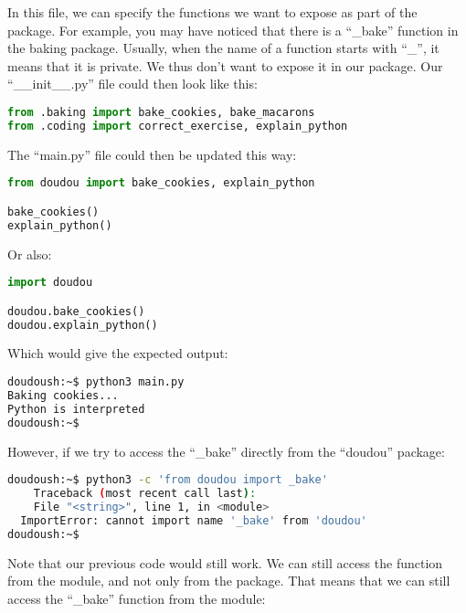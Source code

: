 \vspace{5mm}


\vspace{5mm}

In this file, we can specify the functions we want to expose as part of the package.
For example, you may have noticed that there is a ``\_bake'' function in the baking package.
Usually, when the name of a function starts with ``\_'', it means that it is private.
We thus don't want to expose it in our package. Our ``\_\_init\_\_.py'' file could then
look like this:

\begin{lstlisting}[language=python]
from .baking import bake_cookies, bake_macarons
from .coding import correct_exercise, explain_python
\end{lstlisting}

The ``main.py'' file could then be updated this way:

\begin{lstlisting}[language=python]
from doudou import bake_cookies, explain_python

bake_cookies()
explain_python()
\end{lstlisting}

Or also:
\begin{lstlisting}[language=python]
import doudou

doudou.bake_cookies()
doudou.explain_python()
\end{lstlisting}

Which would give the expected output:

\begin{lstlisting}[language=bash]
doudoush:~$ python3 main.py
Baking cookies...
Python is interpreted
doudoush:~$
\end{lstlisting}

However, if we try to access the ``\_bake'' directly from the ``doudou'' package:

\begin{lstlisting}[language=bash]
doudoush:~$ python3 -c 'from doudou import _bake'
    Traceback (most recent call last):
    File "<string>", line 1, in <module>
  ImportError: cannot import name '_bake' from 'doudou'
doudoush:~$
\end{lstlisting}

Note that our previous code would still work. We can still access the function
from the module, and not only from the package. That means that we can still access
the ``\_bake'' function from the module:

